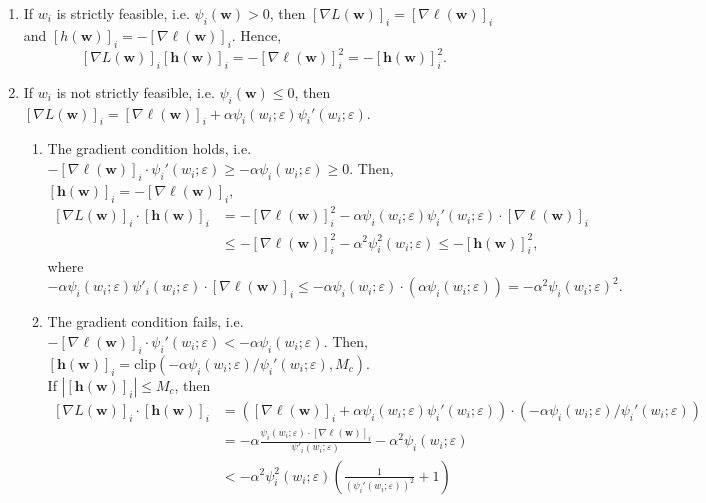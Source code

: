 \documentclass[10pt,a4paper]{article}
\begin{document}
\begin{enumerate}[label=Case \arabic*., leftmargin=2.5cm]
\item If $w_i$ is strictly feasible, i.e. $\psi_i(\mathbf{w})> 0$, then $[\nabla L(\mathbf{w})]_i=[\nabla \ell(\mathbf{w})]_i$ and $[h(\mathbf{w})]_i=-[\nabla \ell(\mathbf{w})]_i$. Hence, \[[\nabla L(\mathbf{w})]_i [\mathbf{h}(\mathbf{w})]_i=-[\nabla \ell(\mathbf{w})]_i^2= -[\mathbf{h}(\mathbf{w})]_i ^2.\]
\item If $w_i$ is not strictly feasible, i.e. $\psi_i(\mathbf{w})\leq 0$, then $[\nabla L(\mathbf{w})]_i=[\nabla \ell(\mathbf{w})]_i+\alpha\psi_i(w_i;\varepsilon)\psi_i'(w_i;\varepsilon)$.
    \begin{enumerate}
        \item The gradient condition holds, i.e. $-[\nabla\ell(\mathbf{w})]_i\cdot\psi_i'(w_i;\varepsilon)\geq -\alpha \psi_i(w_i;\varepsilon)\geq 0$. Then, $[\mathbf{h}(\mathbf{w})]_i=-[\nabla \ell(\mathbf{w})]_i,$ \[\begin{aligned}[\nabla L(\mathbf{w})]_i\cdot [\mathbf{h}(\mathbf{w})]_i&=-[\nabla \ell(\mathbf{w})]_i^2-\alpha \psi_i(w_i;\varepsilon) \psi_i'(w_i;\varepsilon)\cdot [\nabla \ell(\mathbf{w})]_i\\
        &\leq-[\nabla\ell(\mathbf{w})]_i^2-\alpha^2\psi_i^2(w_i;\varepsilon)\leq -[\mathbf{h}(\mathbf{w})]_i ^2,\end{aligned}\] where \[-\alpha\psi_i(w_i;\varepsilon)\psi'_i(w_i;\varepsilon)\cdot[\nabla \ell(\mathbf{w})]_i\leq -\alpha \psi_i(w_i;\varepsilon)\cdot(\alpha\psi_i(w_i;\varepsilon))=-\alpha^2\psi_i(w_i;\varepsilon)^2.\]
        \item The gradient condition fails, i.e. $-[\nabla\ell(\mathbf{w})]_i\cdot\psi_i'(w_i;\varepsilon)< -\alpha \psi_i(w_i;\varepsilon)$. Then, $[\mathbf{h}(\mathbf{w})]_i=\text{clip}(-\alpha\psi_i(w_i;\varepsilon)/\psi_i'(w_i;\varepsilon), M_c)$. \\If $|[\mathbf{h}(\mathbf{w})]_i|\leq M_c$, then \[\begin{aligned}[\nabla L(\mathbf{w})]_i\cdot [\mathbf{h}(\mathbf{w})]_i&=([\nabla\ell(\mathbf{w})]_i+\alpha\psi_i(w_i;\varepsilon)\psi_i'(w_i;\varepsilon))\cdot (-\alpha\psi_i(w_i;\varepsilon)/\psi_i'(w_i;\varepsilon))\\
        & =-\alpha\frac{\psi_i(w_i;\varepsilon)\cdot[\nabla \ell(\mathbf{w})]_i}{\psi'_i(w_i;\varepsilon)}-\alpha^2\psi_i(w_i;\varepsilon)\\
        &<-\alpha^2\psi_i^2(w_i;\varepsilon)\left(\frac{1}{(\psi_i'(w_i;\varepsilon))^2}+1\right)\\

\end{aligned}\]
\end{enumerate}
\end{enumerate}
\end{document}
